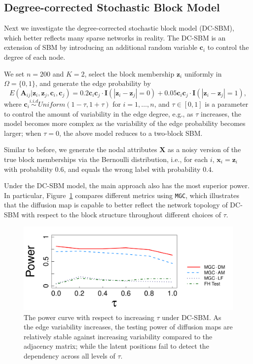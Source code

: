 \documentclass[11pt]{article}
\theoremstyle{definition}
\begin{document}
\subsection{Degree-corrected Stochastic Block Model}
Next we investigate the degree-corrected stochastic block model (DC-SBM), which better reflects many sparse networks in reality. The DC-SBM is an extension of SBM by introducing an additional random variable $\mathbf{c}_{i}$ to control the degree of each node. 

We set $n=200$ and $K=2$, select the block membership $\mathbf{z}_i$ uniformly in $\Omega=\{0,1\}$, and generate the edge probability by  
\vspace*{-0.4cm}
\begin{equation}
E( \mathbf{A}_{ij} | \mathbf{z}_{i}, \mathbf{z}_{j},\mathbf{c}_{i},\mathbf{c}_{j} )  = 0.2 \mathbf{c}_{i} \mathbf{c}_{j} \cdot \mathbf{I}( |\mathbf{z}_{i} - \mathbf{z}_{j}| = 0 ) + 0.05 \mathbf{c}_{i} \mathbf{c}_{j} \cdot \mathbf{I}(|\mathbf{z}_{i} - \mathbf{z}_{j}| = 1),
\label{eq:tau}
\end{equation} 
where $\mathbf{c}_{i} \overset{i.i.d}{\sim} Uniform(1 - \tau, 1 + \tau)$ for $i = 1, \ldots, n$, and $\tau \in [0, 1]$ is a parameter to control the amount of variability in the edge degree, e.g., as $\tau$ increases, the model becomes more complex as the variability of the edge probability becomes larger; when $\tau=0$, the above model reduces to a two-block SBM. 

Similar to before, we generate the nodal attributes $\mathbf{X}$ as a noisy version of the true block memberships via the Bernoulli distribution, i.e., for each $i$, $\mathbf{x}_{i}= \mathbf{z}_{i}$ with probability $0.6$, and equals the wrong label with probability $0.4$.

Under the DC-SBM model, the main approach also has the most superior power. In particular, Figure~\ref{fig:tau} compares different metrics using \texttt{MGC}, which illustrates that the diffusion map is capable to better reflect the network topology of DC-SBM with respect to the block structure throughout different choices of $\tau$.

\begin{figure}[ht]
	\centering
	\includegraphics[width=0.7\linewidth]{../Figure/elbow3_dcSBM.pdf}
	\caption{The power curve with respect to increasing $\tau$ under DC-SBM. As the edge variability increases, the testing power of diffusion maps are relatively stable against increasing variability compared to the adjacency matrix; while the latent positions fail to detect the dependency across all levels of $\tau$.} 
	\label{fig:tau}
\end{figure}
\end{document}

